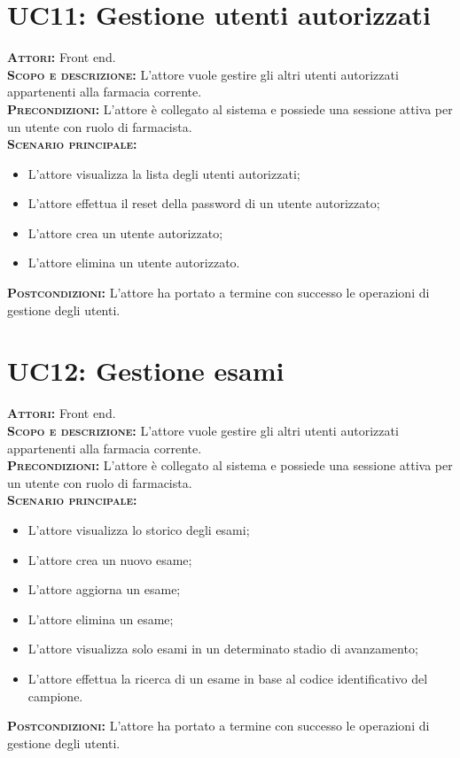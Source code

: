 \section{UC11: Gestione utenti autorizzati}
\label{sec:UC11}
\textsc{\textbf{Attori:}} Front end.\\
\textsc{\textbf{Scopo e descrizione:}} L'attore vuole gestire gli altri utenti autorizzati appartenenti alla farmacia corrente.\\
\textsc{\textsc{\textbf{Precondizioni:}}} L'attore è collegato al sistema e possiede una sessione attiva per un utente con ruolo di farmacista.\\
\textsc{\textbf{Scenario principale:}}
\begin{itemize}
    \item L'attore visualizza la lista degli utenti autorizzati;
    \item L'attore effettua il reset della password di un utente autorizzato;
    \item L'attore crea un utente autorizzato;
    \item L'attore elimina un utente autorizzato.
\end{itemize}
\textsc{\textbf{Postcondizioni:}} L'attore ha portato a termine con successo le operazioni di gestione degli utenti.

\section{UC12: Gestione esami}
\label{sec:UC12}
\textsc{\textbf{Attori:}} Front end.\\
\textsc{\textbf{Scopo e descrizione:}} L'attore vuole gestire gli altri utenti autorizzati appartenenti alla farmacia corrente.\\
\textsc{\textsc{\textbf{Precondizioni:}}} L'attore è collegato al sistema e possiede una sessione attiva per un utente con ruolo di farmacista.\\
\textsc{\textbf{Scenario principale:}}
\begin{itemize}
    \item L'attore visualizza lo storico degli esami;
    \item L'attore crea un nuovo esame;
    \item L'attore aggiorna un esame;
    \item L'attore elimina un esame;
    \item L'attore visualizza solo esami in un determinato stadio di avanzamento;
    \item L'attore effettua la ricerca di un esame in base al codice identificativo del campione.
\end{itemize}
\textsc{\textbf{Postcondizioni:}} L'attore ha portato a termine con successo le operazioni di gestione degli utenti.

